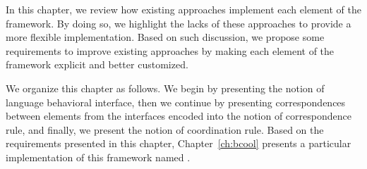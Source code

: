 In this chapter, we review how existing approaches implement each element of the framework. By doing so, we highlight the lacks of these approaches to provide a more flexible implementation. Based on such discussion, we propose some requirements to improve existing approaches by making each element of the framework explicit and better customized. 

We organize this chapter as follows. We begin by presenting the notion of language behavioral interface, then we continue by presenting correspondences between elements from the interfaces encoded into the notion of correspondence rule, and finally, we present the notion of coordination rule. Based on the requirements presented in this chapter, Chapter~\ref{ch:bcool} presents a particular implementation of this framework named \bcool.

